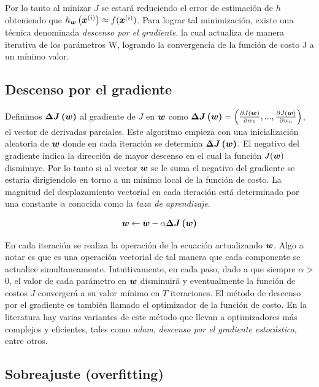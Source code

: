 Por lo tanto al minizar $J$ se estará reduciendo el error de estimación de $h$
obteniendo que $h_{\boldsymbol{w}}\left( \boldsymbol{x}^{(i)} \right) \approx f(\boldsymbol{x}^{(i)})$. Para
lograr tal minimización, existe una técnica denominada \emph{descenso por el
gradiente}. la cual actualiza de manera iterativa de los parámetros W, logrando
la convergencia de la función de costo J a un mínimo valor.

\subsection{Descenso por el gradiente}

Definimos $\boldsymbol{\Delta J\left( w \right)}$ al gradiente de $J$ en $\boldsymbol{w}$
como $\boldsymbol{\Delta J\left( \boldsymbol{w} \right)} = \left(\frac{\partial
J(\boldsymbol{w})}{\partial w_1}, ..., \frac{\partial J(\boldsymbol{w})}{\partial w_n}
\right)$, el vector de derivadas parciales. Este algoritmo empieza con una
inicialización aleatoria de $\boldsymbol{w}$ donde en cada iteración se determina
$\boldsymbol{\Delta J\left( w \right)}$. El negativo del gradiente indica la dirección
de mayor descenso en el cual la función $J(\boldsymbol{w})$ disminuye. Por lo tanto si
al vector $\boldsymbol{w}$ se le suma el negativo del gradiente se estaría
dirigiendolo en torno a un mínimo local de la función de costo. La magnitud del
desplazamiento vectorial en cada iteración está determinado por una constante
$\alpha$ conocida como la \emph{taza de aprendizaje}.

\begin{align*}
    \boldsymbol{w} \leftarrow \boldsymbol{w} - \alpha \boldsymbol{\Delta J\left( w \right)}
\end{align*}

En cada iteración se realiza la operación de la ecuación actualizando
$\boldsymbol{w}$. Algo a notar es que es una operación vectorial de tal manera que
cada componente se actualice simultaneamente. Intuitivamente, en cada paso, dado
a que siempre $\alpha$ > 0, el valor de cada parámetro en $\boldsymbol{w}$ disminuirá
y eventualmente la función de costos $J$ convergerá a su valor mínimo en $T$
iteraciones. El método de descenso por el gradiente es también llamado el
optimizador de la función de costo. En la literatura hay varias variantes de
este método que llevan a optimizadores más complejos y eficientes, tales como
\emph{adam}, \emph{descenso por el gradiente estocástico}, entre otros.

\subsection{Sobreajuste (overfitting)}

